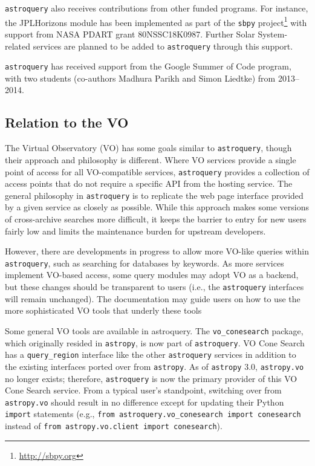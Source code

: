 \documentclass[twocolumn]{aastex62}
\newcommand{\package}[1]{\texttt{#1}\xspace}
\newcommand{\astroquery}{\package{astroquery}}
\newcommand{\astropypkg}{\package{astropy}}
\begin{document}
\astroquery also receives contributions from other funded programs. For instance, the
JPLHorizons module has been implemented as part of the \texttt{sbpy}
project\footnote{\url{http://sbpy.org}} with support from NASA PDART grant
80NSSC18K0987. Further Solar System-related services are planned to be added to
\astroquery through this support.

\astroquery has received support from the Google Summer of Code
program, with two students (co-authors Madhura Parikh and Simon Liedtke)
from 2013--2014.



\subsection{Relation to the VO}
\label{sec:vo}

The Virtual Observatory (VO) has some goals similar to \astroquery,
though their approach and philosophy is different.  Where VO services provide a
single point of access for all VO-compatible services, \astroquery
provides a collection of access points that do not require a specific API from
the hosting service.  The general philosophy in \astroquery is to
replicate the web page interface provided by a given service as closely as
possible.  While this approach makes some versions of cross-archive searches
more difficult, it keeps the barrier to entry for new users fairly low and limits
the maintenance burden for upstream developers.

However, there are developments in progress to allow more VO-like queries
within \astroquery, such as searching for databases by keywords.  As more
services implement VO-based access, some query modules may adopt VO as a backend,
but these changes should be transparent to users (i.e., the \astroquery
interfaces will remain unchanged).  The documentation may guide users on how
to use the more sophisticated VO tools that underly these tools


Some general VO tools are available in astroquery.  The \texttt{vo\_conesearch}
package, which originally resided in \astropypkg, is now part of \astroquery.  VO
Cone Search has a \texttt{query\_region} interface like the other \astroquery
services in addition to the existing interfaces ported over from \astropypkg.
As of \astropypkg 3.0, \texttt{astropy.vo} no longer exists; therefore,
\astroquery is now the primary provider of this VO Cone Search service. From a
typical user's standpoint, switching over from \texttt{astropy.vo} should
result in no difference except for updating their Python \texttt{import}
statements (e.g., \texttt{from astroquery.vo\_conesearch import conesearch}
instead of \texttt{from astropy.vo.client import conesearch}).
\end{document}
